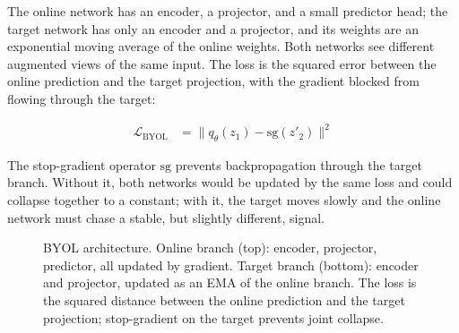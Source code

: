 \vspace{1.5em}

\cite{Grill2020BYOL}
The online network has an encoder, a projector, and a small predictor head; the target network has only an encoder and a projector, and its weights are an exponential moving average of the online weights.
Both networks see different augmented views of the same input.
The loss is the squared error between the online prediction and the target projection, with the gradient blocked from flowing through the target:

\begin{align}
    \mathcal{L}_{\text{BYOL}} &= \|q_\theta(z_1) - \mathrm{sg}(z'_2)\|^2
    \label{eq:byol}
\end{align}

The stop-gradient operator $\mathrm{sg}$ prevents backpropagation through the target branch.
Without it, both networks would be updated by the same loss and could collapse together to a constant; with it, the target moves slowly and the online network must chase a stable, but slightly different, signal.

\begin{figure}
\centering
{}
\caption{BYOL architecture. Online branch (top): encoder, projector, predictor, all updated by gradient. Target branch (bottom): encoder and projector, updated as an EMA of the online branch. The loss is the squared distance between the online prediction and the target projection; stop-gradient on the target prevents joint collapse.}
\label{fig:byol_arch}
\end{figure}

